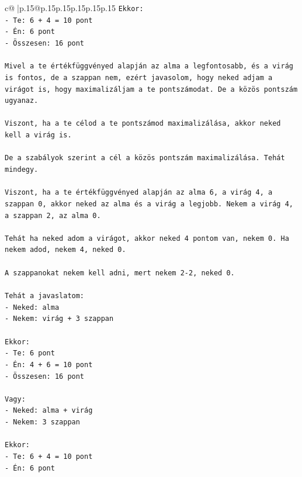 \documentclass{article}
\begin{document}
{\begin{supertabular}{c@{$\;$}|p{.15\linewidth}@{}p{.15\linewidth}p{.15\linewidth}p{.15\linewidth}p{.15\linewidth}p{.15\linewidth}}
{{{\texttt{Ekkor:} \\
\texttt{{-} Te: 6 + 4 = 10 pont} \\
\texttt{{-} Én: 6 pont} \\
\texttt{{-} Összesen: 16 pont} \\
\\ 
\texttt{Mivel a te értékfüggvényed alapján az alma a legfontosabb, és a virág is fontos, de a szappan nem, ezért javasolom, hogy neked adjam a virágot is, hogy maximalizáljam a te pontszámodat. De a közös pontszám ugyanaz.} \\
\\ 
\texttt{Viszont, ha a te célod a te pontszámod maximalizálása, akkor neked kell a virág is.} \\
\\ 
\texttt{De a szabályok szerint a cél a közös pontszám maximalizálása. Tehát mindegy.} \\
\\ 
\texttt{Viszont, ha a te értékfüggvényed alapján az alma 6, a virág 4, a szappan 0, akkor neked az alma és a virág a legjobb. Nekem a virág 4, a szappan 2, az alma 0.} \\
\\ 
\texttt{Tehát ha neked adom a virágot, akkor neked 4 pontom van, nekem 0. Ha nekem adod, nekem 4, neked 0.} \\
\\ 
\texttt{A szappanokat nekem kell adni, mert nekem 2{-}2, neked 0.} \\
\\ 
\texttt{Tehát a javaslatom:} \\
\texttt{{-} Neked: alma} \\
\texttt{{-} Nekem: virág + 3 szappan} \\
\\ 
\texttt{Ekkor:} \\
\texttt{{-} Te: 6 pont} \\
\texttt{{-} Én: 4 + 6 = 10 pont} \\
\texttt{{-} Összesen: 16 pont} \\
\\ 
\texttt{Vagy:} \\
\texttt{{-} Neked: alma + virág} \\
\texttt{{-} Nekem: 3 szappan} \\
\\ 
\texttt{Ekkor:} \\
\texttt{{-} Te: 6 + 4 = 10 pont} \\
\texttt{{-} Én: 6 pont} \\
}}}
\end{supertabular}}
\end{document}

